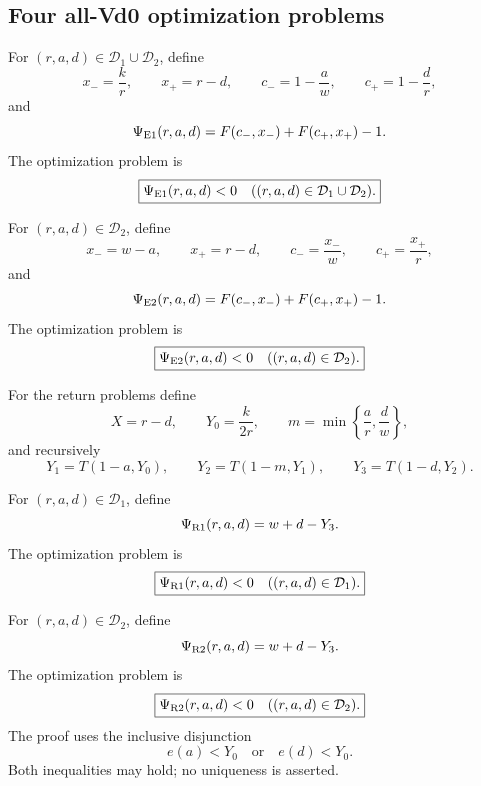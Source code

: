 \subsection{Four all-Vd0 optimization problems}

\begin{definition}
\label{prob:s2-one-gap-endpoint}
For \((r,a,d)\in\mathcal D_1\cup\mathcal D_2\), define
\[
 x_-=\frac{k}{r},
 \qquad
 x_+=r-d,
 \qquad
 c_-=1-\frac a w,
 \qquad
 c_+=1-\frac d r,
\]
and
\[
 \Psi_{\rm E1}(r,a,d)
 =
 F(c_-,x_-)+F(c_+,x_+)-1.
\]
The optimization problem is
\[
 \boxed{
 \Psi_{\rm E1}(r,a,d)<0
 \quad
 ((r,a,d)\in\mathcal D_1\cup\mathcal D_2).
 }
\]
\end{definition}

\begin{definition}
\label{prob:s2-two-gap-endpoint}
For \((r,a,d)\in\mathcal D_2\), define
\[
 x_-=w-a,
 \qquad
 x_+=r-d,
 \qquad
 c_-=\frac{x_-}{w},
 \qquad
 c_+=\frac{x_+}{r},
\]
and
\[
 \Psi_{\rm E2}(r,a,d)
 =
 F(c_-,x_-)+F(c_+,x_+)-1.
\]
The optimization problem is
\[
 \boxed{
 \Psi_{\rm E2}(r,a,d)<0
 \quad
 ((r,a,d)\in\mathcal D_2).
 }
\]
\end{definition}

For the return problems define
\[
 X=r-d,\qquad
 Y_0=\frac{k}{2r},\qquad
 m=\min\left\{\frac ar,\frac dw\right\},
\]
and recursively
\[
 Y_1=T(1-a,Y_0),\qquad
 Y_2=T(1-m,Y_1),\qquad
 Y_3=T(1-d,Y_2).
\]

\begin{definition}
\label{prob:s2-ce1-five-chain}
For \((r,a,d)\in\mathcal D_1\), define
\[
 \Psi_{\rm R1}(r,a,d)=w+d-Y_3.
\]
The optimization problem is
\[
 \boxed{
 \Psi_{\rm R1}(r,a,d)<0
 \quad
 ((r,a,d)\in\mathcal D_1).
 }
\]
\end{definition}

\begin{definition}
\label{prob:s2-ce2-five-chain}
For \((r,a,d)\in\mathcal D_2\), define
\[
 \Psi_{\rm R2}(r,a,d)=w+d-Y_3.
\]
The optimization problem is
\[
 \boxed{
 \Psi_{\rm R2}(r,a,d)<0
 \quad
 ((r,a,d)\in\mathcal D_2).
 }
\]
The proof uses the inclusive disjunction
\[
 e(a)<Y_0\quad\text{or}\quad e(d)<Y_0.
\]
Both inequalities may hold; no uniqueness is asserted.
\end{definition}
